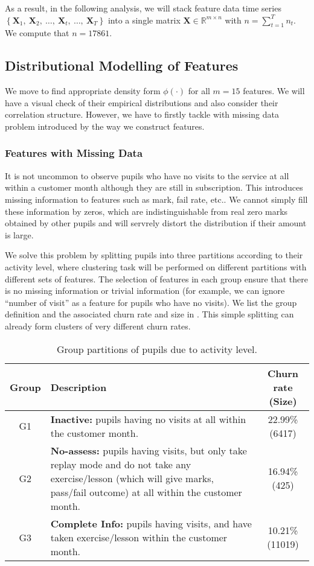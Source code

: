 As a result, in the following analysis, we will stack feature data time series $\left\lbrace \mathbf{X}_1, ~\mathbf{X}_2, ~\dots, ~\mathbf{X}_t, ~\dots, ~\mathbf{X}_T \right\rbrace$ into a single matrix $\mathbf{X} \in \mathbb{R}^{m \times n}$ with $n = \sum_{t=1}^{T} n_t$. We compute that $n=17861$.

\subsection{Distributional Modelling of Features}

We move to find appropriate density form $\phi(\cdot)$ for all $m=15$ features. We will have a visual check of their empirical distributions and also consider their correlation structure. However, we have to firstly tackle with missing data problem introduced by the way we construct features.

\subsubsection{Features with Missing Data}

It is not uncommon to observe pupils who have no visits to the service at all within a customer month although they are still in subscription. This introduces missing information to features such as mark, fail rate, etc.. We cannot simply fill these information by zeros, which are indistinguishable from real zero marks obtained by other pupils and will servrely distort the distribution if their amount is large. 

We solve this problem by splitting pupils into three partitions according to their activity level, where clustering task will be performed on different partitions with different sets of features. The selection of features in each group ensure that there is no missing information or trivial information (for example, we can ignore ``number of visit'' as a feature for pupils who have no visits). We list the group definition and the associated churn rate and size in . This simple splitting can already form clusters of very different churn rates. 

\begin{table}[!h]
\centering
\footnotesize
\begin{tabular}{c|p{9cm}|c}
\hline
\textbf{Group} & \textbf{Description} & \textbf{Churn rate (Size)}\\
\hline
G1 &
\textbf{Inactive:} pupils having no visits at all within the customer month. &
22.99\% (6417) \\
\hline
G2 &
\textbf{No-assess:} pupils having visits, but only take replay mode and do not take any exercise/lesson (which will give marks, pass/fail outcome) at all within the customer month. &
16.94\% (425) \\
\hline
G3 &
\textbf{Complete Info:} pupils having visits, and have taken exercise/lesson within the customer month. &
10.21\% (11019) \\
\hline
\end{tabular}
\caption{Group partitions of pupils due to activity level.}
\label{tab:G123}
\end{table}


